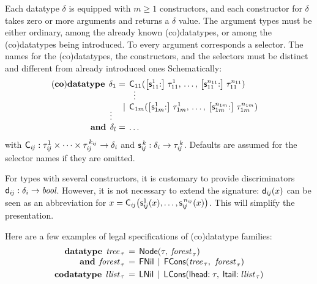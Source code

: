 Each datatype $\delta$ is equipped with
$m \ge 1$ constructors, and each constructor for $\delta$ takes zero or more
arguments and returns a $\delta$ value. The argument types must be either
ordinary, among the already known (co)datatypes, or among the (co)datatypes
being introduced.
%
To every argument corresponds a selector. The names for the (co)data\-types, the
constructors, and the selectors must be distinct and different from already
introduced ones%
Schematically:
%
\[
\begin{aligned}[t]
(\keyw{co})\keyw{datatype}\;\,
  \delta_1 & {}=\, \smash{\const{C}_{11}(\bigl[\const{s}_{11}^1{:}\bigr]\; \tau_{11}^1, \,\ldots,\, \bigl[\const{s}_{11}^{n_{11}}{:}\bigr]\; \tau_{11}^{n_{11}})} & \\
           & {}\;\phantom{=\,}\;{} \smash{\,\,\,\vdots} \\[-\jot] %
           & {}\;\phantom{=\,}\llap{\ensuremath{\,\mid\,}}\; \smash{\const{C}_{1m}(\bigl[\const{s}_{1m}^1{:}\bigr]\; \tau_{1m}^1, \,\ldots,\, \big[\const{s}_{1m}^{n_{1m}}{:}\big]\; \tau_{1m}^{n_{1m}})} \\[-1\jot]
   \smash{\vdots\,\,\,} \\[-1\jot]
  \keyw{and}\; \,\delta_l & =\, \ldots
\end{aligned}
\]
%
with
$\textsf{C}_{i\kern-0.083333em j} : \tau_{i\kern-0.083333em j}^1\times\cdots\times\tau_{i\kern-0.083333em j}^{\,k_{\smash{i\kern-0.083333em j}}} \to \delta_i$
and $\textsf{s}_{i\kern-0.083333em j}^{\,k} : \delta_i \to \tau_{i\kern-0.083333em j}^{\,k}$. Defaults are assumed for
the selector names if they are omitted.

For types with several constructors, it is customary to provide discriminators
$\textsf{d}_{i\kern-0.083333em j} : \delta_i \to \textit{bool}$. However,
it is not necessary to extend the signature:
$\textsf{d}_{i\kern-0.083333em j}(x)$ can be seen as an abbreviation for
$x = \textsf{C}_{i\kern-0.083333em j}\bigl(\textsf{s}_{i\kern-0.083333em j}^1(x), \ldots, \textsf{s}_{i\kern-0.083333em j}^{\,n_{\smash{{i\kern-0.083333em j}}}}(x)\bigr)$.
This will simplify the presentation. %

Here are a few examples of legal specifications of (co)datatype families:
\[\begin{aligned}[t]
      \keyw{datatype}\;\, \ty{tree}_{\,\tau} & \,=\, \const{Node}(\tau,\: \ty{forest}_{\,\tau}) \\[-\jot]
      \keyw{and}\;\, \ty{forest}_{\,\tau} & \,=\, \const{FNil} \,\mid\, \const{FCons}(\ty{tree}_{\,\tau},\:\, \ty{forest}_{\,\tau}) \\%
      \keyw{codatatype}\; \,\ty{llist}_{\,\tau} & \,=\, \const{LNil} \,\mid\, \const{LCons}(\const{lhead}{:}\; \tau,\; \const{ltail}{:}\;\ty{llist}_{\,\tau})
\end{aligned}
\]

